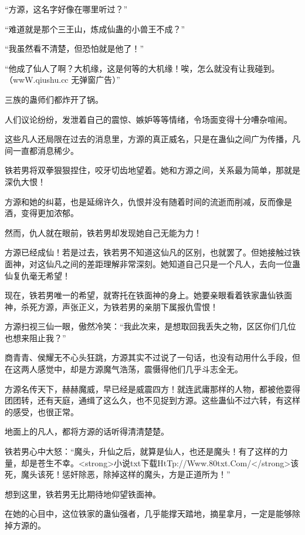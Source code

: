 
\begin{this_body}

“方源，这名字好像在哪里听过？”

“难道就是那个三王山，炼成仙蛊的小兽王不成？”

“我虽然看不清楚，但恐怕就是他了！”

“他成了仙人了啊？大机缘，这是何等的大机缘！唉，怎么就没有让我碰到。（wwW.qiushu.cc 无弹窗广告）”

三族的蛊师们都炸开了锅。

人们议论纷纷，发泄着自己的震惊、嫉妒等等情绪，令场面变得十分嘈杂喧闹。

这些凡人还局限在过去的消息里，方源的真正威名，只是在蛊仙之间广为传播，凡间一直都消息稀少。

铁若男将双拳狠狠捏住，咬牙切齿地望着。她和方源之间，关系最为简单，那就是深仇大恨！

方源和她的纠葛，也是延绵许久，仇恨并没有随着时间的流逝而削减，反而像是酒，变得更加浓郁。

然而，仇人就在眼前，铁若男却发现她自己无能为力！

方源已经成仙！若是过去，铁若男不知道这仙凡的区别，也就罢了。但她接触过铁面神，对这仙凡之间的差距理解非常深刻。她知道自己只是一个凡人，去向一位蛊仙复仇毫无希望！

现在，铁若男唯一的希望，就寄托在铁面神的身上。她要亲眼看着铁家蛊仙铁面神，杀死方源，声张正义，为铁若男的亲朋下属报仇雪恨！

方源扫视三仙一眼，傲然冷笑：“我此次来，是想取回我丢失之物，区区你们几位也想来阻止我？”

商青青、侯耀无不心头狂跳，方源其实不过说了一句话，也没有动用什么手段，但在这两人感觉中，却是方源魔气浩荡，震慑得他们几乎斗志全无。

方源名传天下，赫赫魔威，早已经是威震四方！就连武庸那样的人物，都被他耍得团团转，还有天庭，通缉了这么久，也不见捉到方源。这些蛊仙不过六转，有这样的感受，也很正常。

地面上的凡人，都将方源的话听得清清楚楚。

铁若男心中大怒：“魔头，升仙之后，就算是仙人，也还是魔头！有了这样的力量，却是苍生不幸。<strong>小说txt下载HtTp://Www.80txt.Com/</strong>该死，魔头该死！惩奸除恶，除掉这样的魔头，方是正道所为！”

想到这里，铁若男无比期待地仰望铁面神。

在她的心目中，这位铁家的蛊仙强者，几乎能撑天踏地，摘星拿月，一定是能够除掉方源的。


\end{this_body}
